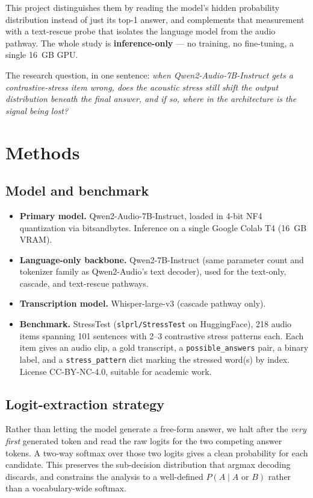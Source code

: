\documentclass[11pt]{article}
\begin{document}
This project distinguishes them by reading the model's hidden
probability distribution instead of just its top-1 answer, and
complements that measurement with a text-rescue probe that isolates
the language model from the audio pathway. The whole study is
\textbf{inference-only} --- no training, no fine-tuning, a single
16~GB GPU.

The research question, in one sentence: \emph{when
Qwen2-Audio-7B-Instruct gets a contrastive-stress item wrong, does
the acoustic stress still shift the output distribution beneath the
final answer, and if so, where in the architecture is the signal
being lost?}

\section{Methods}

\subsection{Model and benchmark}

\begin{itemize}
    \item \textbf{Primary model.} Qwen2-Audio-7B-Instruct, loaded in
    4-bit NF4 quantization via bitsandbytes. Inference on a single
    Google Colab T4 (16~GB VRAM).
    \item \textbf{Language-only backbone.} Qwen2-7B-Instruct (same
    parameter count and tokenizer family as Qwen2-Audio's text
    decoder), used for the text-only, cascade, and text-rescue
    pathways.
    \item \textbf{Transcription model.} Whisper-large-v3 (cascade
    pathway only).
    \item \textbf{Benchmark.} StressTest (\texttt{slprl/StressTest}
    on HuggingFace), 218 audio items spanning 101 sentences with
    2--3 contrastive stress patterns each. Each item gives an audio
    clip, a gold transcript, a \texttt{possible\_answers} pair, a
    binary label, and a \texttt{stress\_pattern} dict marking the
    stressed word(s) by index. License CC-BY-NC-4.0, suitable for
    academic work.
\end{itemize}

\subsection{Logit-extraction strategy}

Rather than letting the model generate a free-form answer, we halt
after the \emph{very first} generated token and read the raw logits
for the two competing answer tokens. A two-way softmax over those
two logits gives a clean probability for each candidate. This
preserves the sub-decision distribution that argmax decoding
discards, and constrains the analysis to a well-defined
$P(A \mid A \text{ or } B)$ rather than a vocabulary-wide softmax.
\end{document}
